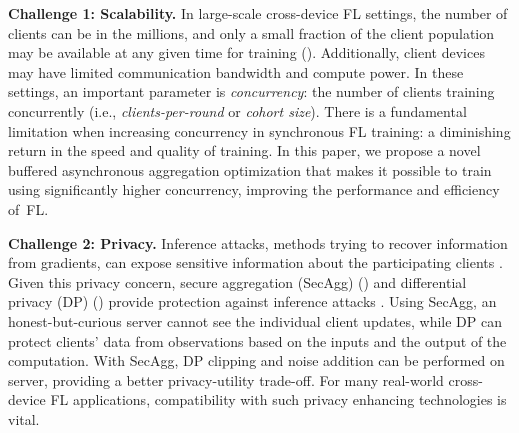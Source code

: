 \documentclass[twoside]{article}
\newcommand{\john}[1]{\todo[color=yellow!20,size=\footnotesize,inline,caption={}]{JN: #1}{}}
\newcommand{\mike}[1]{\todo[color=blue!20,size=\footnotesize,inline,caption={}]{MR: #1}{}}
\newcommand{\concurrency}{{concurrency}\xspace}
\newcommand{\syncfl}{{SyncFL}\xspace}
\begin{document}
\textbf{Challenge 1: Scalability.} In large-scale cross-device FL settings, the number of clients can be in the millions, and only a small fraction of the client population may be available at any given time for training (\cite{fl_field_guide}). Additionally, client devices may have limited communication bandwidth and compute power. In these settings, an important parameter is \emph{\concurrency}: the number of clients training concurrently (i.e., \emph{clients-per-round} or \emph{cohort size}). 
There is a fundamental limitation when increasing concurrency in synchronous FL training: a diminishing return in the speed and quality of training. In this paper, we propose a novel buffered asynchronous aggregation optimization that makes it possible to train using significantly higher concurrency, improving the performance and efficiency of~FL.

\textbf{Challenge 2: Privacy.}
Inference attacks, methods trying to recover information from gradients, can expose sensitive information about the participating clients \citep{melis2019exploiting, geiping2020inverting}. Given this privacy concern, secure aggregation (SecAgg) (\cite{secagg-sgx, secagg}) and differential privacy (DP) (\cite{dpftrl, google-dp-fl}) provide protection against inference attacks \citep{lauren_alex, extraction}. Using SecAgg, an honest-but-curious server cannot see the individual client updates, while DP can protect clients’ data from observations based on the inputs and the output of the computation. With SecAgg, DP clipping and noise addition can be performed on server, providing a better privacy-utility trade-off. For many real-world cross-device FL applications, compatibility with such privacy enhancing technologies is vital.  
\end{document}
